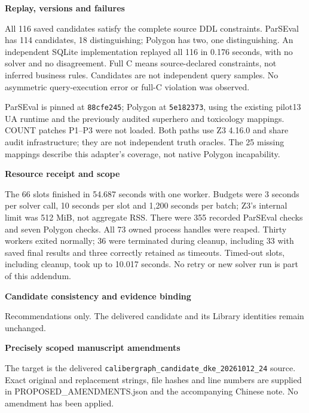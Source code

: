 \documentclass[10pt]{article}
\newcommand{\head}[1]{\medskip\textbf{#1}\par}
\begin{document}
\head{Replay, versions and failures}
All 116 saved candidates satisfy the complete source DDL constraints. ParSEval has 114 candidates, 18 distinguishing; Polygon has two, one distinguishing. An independent SQLite implementation replayed all 116 in 0.176 seconds, with no solver and no disagreement. Full C means source-declared constraints, not inferred business rules. Candidates are not independent query samples. No asymmetric query-execution error or full-C violation was observed.

ParSEval is pinned at \texttt{88cfe245}; Polygon at \texttt{5e182373}, using the existing pilot13 UA runtime and the previously audited superhero and toxicology mappings. COUNT patches P1--P3 were not loaded. Both paths use Z3 4.16.0 and share audit infrastructure; they are not independent truth oracles. The 25 missing mappings describe this adapter's coverage, not native Polygon incapability.

\head{Resource receipt and scope}
The 66 slots finished in 54.687 seconds with one worker. Budgets were 3 seconds per solver call, 10 seconds per slot and 1,200 seconds per batch; Z3's internal limit was 512 MiB, not aggregate RSS. There were 355 recorded ParSEval checks and seven Polygon checks. All 73 owned process handles were reaped. Thirty workers exited normally; 36 were terminated during cleanup, including 33 with saved final results and three correctly retained as timeouts. Timed-out slots, including cleanup, took up to 10.017 seconds. No retry or new solver run is part of this addendum.

\newpage
{\Large\bfseries Candidate consistency and evidence binding}\par
Recommendations only. The delivered candidate and its Library identities remain unchanged.

\head{Precisely scoped manuscript amendments}
The target is the delivered \texttt{calibergraph\_candidate\_dke\_20261012\_24} source. Exact original and replacement strings, file hashes and line numbers are supplied in PROPOSED\_AMENDMENTS.json and the accompanying Chinese note. No amendment has been applied.
\end{document}
